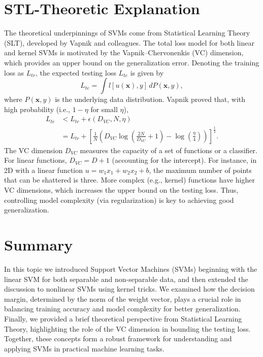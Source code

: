 \documentclass[12pt]{article}
\begin{document}
\section{STL-Theoretic Explanation}
The theoretical underpinnings of SVMs come from Statistical Learning Theory (SLT), developed by Vapnik and colleagues. The total loss model for both linear and kernel SVMs is motivated by the Vapnik–Chervonenkis (VC) dimension, which provides an upper bound on the generalization error. Denoting the training loss as $L_{tr}$, the expected testing loss $L_{te}$ is given by
\[
L_{te} = \int l[u(\bm{x}), y] \, dP(\bm{x}, y),
\]
where $P(\bm{x}, y)$ is the underlying data distribution. Vapnik proved that, with high probability (i.e., $1-\eta$ for small $\eta$),
\begin{equation}
\begin{split}
L_{te} &< L_{tr} + \epsilon(D_{VC}, N, \eta) \\
       &= L_{tr} + \left[\frac{1}{N} \left(D_{VC}\log\left(\frac{2N}{D_{VC}} + 1\right) - \log\left(\frac{\eta}{4}\right)\right)\right]^{\frac{1}{2}}.
\end{split}
\label{t06eq11}
\end{equation}
The VC dimension $D_{VC}$ measures the capacity of a set of functions or a classifier. For linear functions, $D_{VC} = D + 1$ (accounting for the intercept). For instance, in 2D with a linear function $u = w_1 x_1 + w_2 x_2 + b$, the maximum number of points that can be shattered is three. More complex (e.g., kernel) functions have higher VC dimensions, which increases the upper bound on the testing loss. Thus, controlling model complexity (via regularization) is key to achieving good generalization.

\section{Summary}
In this topic we introduced Support Vector Machines (SVMs) beginning with the linear SVM for both separable and non-separable data, and then extended the discussion to nonlinear SVMs using kernel tricks. We examined how the decision margin, determined by the norm of the weight vector, plays a crucial role in balancing training accuracy and model complexity for better generalization. Finally, we provided a brief theoretical perspective from Statistical Learning Theory, highlighting the role of the VC dimension in bounding the testing loss. Together, these concepts form a robust framework for understanding and applying SVMs in practical machine learning tasks.
\end{document}
